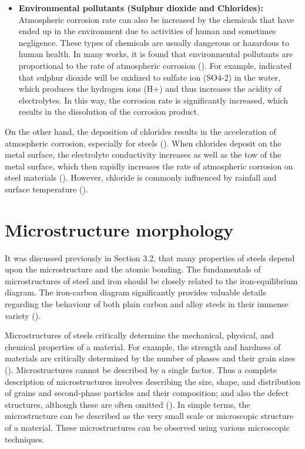 \begin{itemize}
    \item \textbf{Environmental pollutants (Sulphur dioxide and Chlorides):} Atmospheric corrosion rate can also be increased by the chemicals that have ended up in the environment due to activities of human and sometimes negligence. These types of chemicals are usually dangerous or hazardous to human health. In many works, it is found that environmental pollutants are proportional to the rate of atmospheric corrosion (\cite{soler2000metallic, dong2005deformation, islam2018effects}). For example, \cite{cai2018influence} indicated that sulphur dioxide will be oxidized to sulfate ion (SO4-2) in the water, which produces the hydrogen ions (H+) and thus increases the acidity of electrolytes. In this way, the corrosion rate is significantly increased, which results in the dissolution of the corrosion product.
\end{itemize}
    
On the other hand, the deposition of chlorides results in the acceleration of atmospheric corrosion, especially for steels (\cite{islam2018effects}). When chlorides deposit on the metal surface, the electrolyte conductivity increases as well as the \acrshort{tow} of the metal surface, which then rapidly increases the rate of atmospheric corrosion on steel materials (\cite{marzorati2018green}). However, chloride is commonly influenced by rainfall and surface temperature (\cite{cai2018influence}).

\section{Microstructure morphology}
\label{ch3:anchor:section:morphology}
It was discussed previously in Section 3.2, that many properties of steels depend upon the microstructure and the atomic bonding. The fundamentals of microstructures of steel and iron should be closely related to the iron-equilibrium diagram. The iron-carbon diagram significantly provides valuable details regarding the behaviour of both plain carbon and alloy steels in their immense variety (\cite{bhadeshia2017steels}).

Microstructures of steels critically determine the mechanical, physical, and chemical properties of a material. For example, the strength and hardness of materials are critically determined by the number of phases and their grain sizes (\cite{clemens2017microstructure}). Microstructures cannot be described by a single factor. Thus a complete description of microstructures involves describing the size, shape, and distribution of grains and second-phase particles and their composition; and also the defect structures, although these are often omitted (\cite{suryanarayana2017microstructure}). In simple terms, the microstructure can be described as the very small scale or microscopic structure of a material. These microstructures can be observed using various microscopic techniques.  

